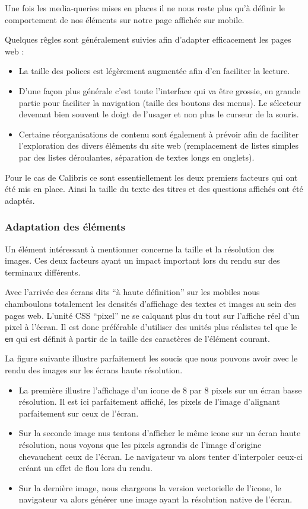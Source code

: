 \documentclass[12pt,a4paper]{book}
\begin{document}
Une fois les media-queries mises en places il ne nous reste plus qu'à définir le comportement de nos éléments sur notre page affichée sur mobile.

Quelques rêgles sont généralement suivies afin d'adapter efficacement les pages web :
\begin{itemize}
  \item La taille des polices est légèrement augmentée afin d'en faciliter la lecture.
  \item D'une façon plus générale c'est toute l'interface qui va être grossie, en grande partie pour faciliter la navigation (taille des boutons des menus). Le sélecteur devenant bien souvent le doigt de l'usager et non plus le curseur de la souris.
  \item Certaine réorganisations de contenu sont également à prévoir afin de faciliter l'exploration des divers éléments du site web (remplacement de listes simples par des listes déroulantes, séparation de textes longs en onglets).
\end{itemize}

Pour le cas de Calibris ce sont essentiellement les deux premiers facteurs qui ont été mis en place. Ainsi la taille du texte des titres et des questions affichés ont été adaptés.

\subsubsection{Adaptation des éléments}

Un élément intéressant à mentionner concerne la taille et la résolution des images. Ces deux facteurs ayant un impact important lors du rendu sur des terminaux différents.

Avec l'arrivée des écrans dits ``à haute définition'' sur les mobiles nous chamboulons totalement les densités d'affichage des textes et images au sein des pages web. L'unité CSS ``pixel'' ne se calquant plus du tout sur l'affiche réel d'un pixel à l'écran. Il est donc préférable d'utiliser des unités plus réalistes tel que le \texttt{em} qui est définit à partir de la taille des caractères de l'élément courant.

La figure suivante illustre parfaitement les soucis que nous pouvons avoir avec le rendu des images sur les écrans haute résolution. 

\begin{itemize}
  \item La première illustre l'affichage d'un icone de 8 par 8 pixels sur un écran basse résolution. Il est ici parfaitement affiché, les pixels de l'image d'alignant parfaitement sur ceux de l'écran.
  \item Sur la seconde image nus tentons d'afficher le même icone sur un écran haute résolution, nous voyons que les pixels agrandis de l'image d'origine chevauchent ceux de l'écran. Le navigateur va alors tenter d'interpoler ceux-ci créant un effet de flou lors du rendu.
  \item Sur la dernière image, nous chargeons la version vectorielle de l'icone, le navigateur va alors générer une image ayant la résolution native de l'écran.
\end{itemize}
\end{document}
